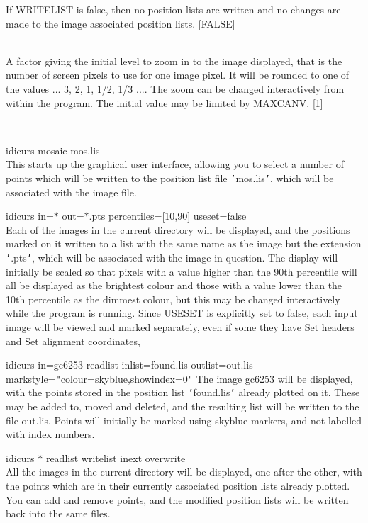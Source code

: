 \documentclass[twoside,11pt]{article}
\renewcommand{\_}{\texttt{\symbol{95}}}
\newcommand{\sstexamples}[1]{
   \item[Examples:] \mbox{} \\
   \vspace{-3.5ex}
   \begin{description}
      #1
   \end{description}
}
\newcommand{\sstsubsection}[1]{ \item[{#1}] \mbox{} \\}
\newcommand{\sstexamplesubsection}[2]{\sloppy \item{\ssttt #1} \mbox{} \\ #2 }
\newcommand{\sstnotes}[1]{\item[Notes:] \mbox{} \\[1.3ex] #1}
\newcommand{\sstitemlist}[1]{
  \mbox{} \\
  \vspace{-3.5ex}
  \begin{itemize}
     #1
  \end{itemize}
}
\newcommand{\sstexamples}[1]{
      \item[Examples:] \\
      \begin{description}
         #1
      \end{description}
      \\
   }
\newcommand{\sstsubsection}[1]{\item[{#1}]}
\newcommand{\sstexamplesubsection}[2]{\item[{\ssttt #1}] #2}
\newcommand{\sstnotes}[1]{\item[Notes:] #1 }
\newcommand{\sstitemlist}[1]{
      \begin{itemize}
         #1
      \end{itemize}
      \\
   }
\begin{document}
{{{         If WRITELIST is false, then no position lists are written and
         no changes are made to the image associated position lists.
         [FALSE]
      }
      \sstsubsection{
         ZOOM = \_INTEGER (Read and Write)
      }{
         A factor giving the initial level to zoom in to the image
         displayed, that is the number of screen pixels to use for one
         image pixel.  It will be rounded to one of the values
         ... 3, 2, 1, 1/2, 1/3 ....  The zoom can be changed
         interactively from within the program.  The initial value
         may be limited by MAXCANV.
         [1]
      }
   }
   \sstexamples{
      \sstexamplesubsection{
         idicurs mosaic mos.lis
      }{
         This starts up the graphical user interface, allowing you to
         select a number of points which will be written to the
         position list file {\tt '}mos.lis{\tt '}, which will be associated with
         the image file.
      }
      \sstexamplesubsection{
         idicurs in=$*$ out=$*$.pts percentiles=[10,90] useset=false
      }{
         Each of the images in the current directory will be displayed,
         and the positions marked on it written to a list with the same
         name as the image but the extension {\tt '}.pts{\tt '}, which will be
         associated with the image in question.  The display will
         initially be scaled so that pixels with a value higher than
         the 90th percentile will all be displayed as the brightest
         colour and those with a value lower than the 10th percentile
         as the dimmest colour, but this may be changed interactively
         while the program is running.  Since USESET is explicitly
         set to false, each input image will be viewed and marked
         separately, even if some they have Set headers and Set
         alignment coordinates,
      }
      \sstexamplesubsection{
         idicurs in=gc6253 readlist inlist=found.lis outlist=out.lis
      }{
              markstyle={\tt "}colour=skyblue,showindex=0{\tt "}
         The image gc6253 will be displayed, with the points stored in
         the position list {\tt '}found.lis{\tt '} already plotted on it.  These
         may be added to, moved and deleted, and the resulting list
         will be written to the file out.lis.  Points will initially
         be marked using skyblue markers, and not labelled with index
         numbers.
      }
      \sstexamplesubsection{
         idicurs $*$ readlist writelist inext overwrite
      }{
         All the images in the current directory will be displayed,
         one after the other, with the points which are in their
         currently associated position lists already plotted.
         You can add and remove points, and the modified position
         lists will be written back into the same files.
      }
   }
   \sstnotes{
      \sstitemlist{

}}}
\end{document}
